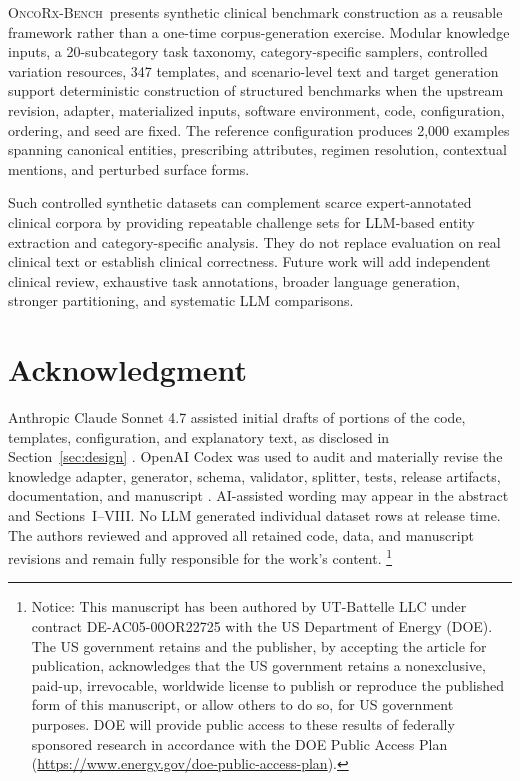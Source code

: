 \documentclass[conference]{IEEEtran}
\newif\ifanonymous
\newcommand{\dataset}{\textsc{OncoRx-Bench}}
\newcommand{\blfootnote}[1]{%
  \begingroup
  \renewcommand{\thefootnote}{}%
  \footnote{#1}%
  \addtocounter{footnote}{-1}%
  \endgroup
}
\begin{document}
\dataset\ presents synthetic clinical benchmark construction as a reusable
framework rather than a one-time corpus-generation exercise. Modular knowledge
inputs, a 20-subcategory task taxonomy, category-specific samplers, controlled
variation resources, 347 templates, and scenario-level text and target
generation support deterministic construction of structured benchmarks when
the upstream revision, adapter, materialized inputs, software environment, code,
configuration, ordering, and seed are fixed. The reference configuration
produces 2,000 examples spanning canonical entities, prescribing attributes, regimen resolution,
contextual mentions, and perturbed surface forms.

Such controlled synthetic datasets can complement scarce expert-annotated
clinical corpora by providing repeatable challenge sets for LLM-based entity
extraction and category-specific analysis. They do not replace evaluation on
real clinical text or establish clinical correctness. Future work will add
independent clinical review, exhaustive task annotations, broader language
generation, stronger partitioning, and systematic LLM comparisons.

\section*{Acknowledgment}

Anthropic Claude Sonnet 4.7 assisted initial drafts of portions of the code,
templates, configuration, and explanatory text, as disclosed in
Section~\ref{sec:design} \cite{anthropic2026}. OpenAI Codex was used to audit
and materially revise the knowledge adapter, generator, schema, validator,
splitter, tests, release artifacts, documentation, and manuscript
\cite{openai2026codex}. AI-assisted wording may appear in the abstract and
Sections~I--VIII. No LLM generated individual dataset rows at release time.
The authors reviewed and approved all retained code, data, and manuscript
revisions and remain fully responsible for the work's content. \ifanonymous
Author-identifying funding and contract acknowledgments
are omitted for anonymous review.\else
\blfootnote{Notice: This manuscript has been authored by UT-Battelle LLC under
contract DE-AC05-00OR22725 with the US Department of Energy (DOE). The US
government retains and the publisher, by accepting the article for publication,
acknowledges that the US government retains a nonexclusive, paid-up,
irrevocable, worldwide license to publish or reproduce the published form of
this manuscript, or allow others to do so, for US government purposes. DOE will
provide public access to these results of federally sponsored research in
accordance with the DOE Public Access Plan
(\url{https://www.energy.gov/doe-public-access-plan}).}
\fi
\end{document}
